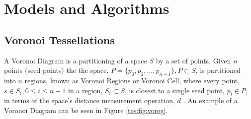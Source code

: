 \section{Models and Algorithms}\label{tes}
\subsection{Voronoi Tessellations}\label{tes:sec:vor}
A Voronoi Diagram is a partitioning of a space $S$ by a set of points. Given $n$ points (seed points) the the space, $P = \{p_0,p_2,...,p_{n-1}\}, P \subset S$, is partitioned into $n$ regions, known as Voronoi Regions or Voronoi Cell, where every point, $s \in S_i,0 \leq i \leq n-1$ in a region, $S_i \subset S$, is closest to a single seed point, $p_i \in P$, in terms of the space's distance measurement operation, $d$ \citep{okabe2009spatial}. An example of a Voronoi Diagram can be seen in Figure \ref{tes:fig:voreg}.
%
